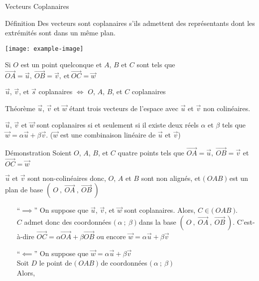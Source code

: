 \documentclass{cours}
\begin{document}
    \begin{Gpartie}{Vecteurs Coplanaires} 
        \begin{Spartie}{Définition} 
            Des vecteurs sont coplanaires s'ils admettent des représentants dont les extrémités sont dans un même plan.
            \begin{center}
                    \texttt{[image: example-image]}
                    \parbox{\linewidth}{}
            \end{center}
            Si $O$ est un point quelconque et $A$, $B$ et $C$ sont tels que $\overrightarrow{OA}=\vec{u},\ \overrightarrow{OB}=\vec{v},\ \text{et}\ \overrightarrow{OC}=\vec{w}$

            $\vec{u}$, $\vec{v}$, et $\vec{s}$ coplanaires $\iff$ $O$, $A$, $B$, et $C$ coplanaires
        \end{Spartie}
        \begin{Spartie}{Théorème} 
            $\vec{u}$, $\vec{v}$ et $\vec{w}$ étant trois vecteurs de l'espace avec $\vec{u}$ et $\vec{v}$ non colinéaires.

            $\vec{u}$, $\vec{v}$ et $\vec{w}$ sont coplanaires si et seulement si il existe deux réels $\alpha$ et $\beta$ tels que $\vec{w}=\alpha\vec{u}+\beta\vec{v}$. \quad\big($\vec{w}$ est une combinaison linéaire de $\vec{u}$ et $\vec{v}$\big)
            \pagebreak
            \begin{SSpartie}{Démonstration} 
                Soient $O$, $A$, $B$, et $C$ quatre points tels que $\overrightarrow{OA}=\vec{u},~\overrightarrow{OB}=\vec{v}$ et $\overrightarrow{OC}=\vec{w}$

                $\vec{u}$ et $\vec{v}$ sont non-colinéaires donc, $O$, $A$ et $B$ sont non alignés, et $\big(~OAB~\big)$ est un plan de base $\left(~O~,~\overrightarrow{OA}~,~\overrightarrow{OB}~\right)$
                \begin{itemize}[leftmargin=7ex]
                    \item[``$\implies$''] On suppose que $\vec{u}$, $\vec{v}$, et $\vec{w}$ sont coplanaires. Alors, $C\in\big(~OAB~\big)$. \\ $C$ admet donc des coordonnées $\big(~\alpha~;~\beta~\big)$ dans la base $\left(~O~,~\overrightarrow{OA}~,~\overrightarrow{OB}~\right)$. C'est-à-dire $\overrightarrow{OC}=\alpha\overrightarrow{OA}+\beta\overrightarrow{OB}$ ou encore $\vec{w}=\alpha\vec{u}+\beta\vec{v}$
                    \item[``$\impliedby$''] On suppose que $\vec{w}=\alpha\vec{u}+\beta\vec{v}$ \\ Soit $D$ le point de $\big(~OAB~\big)$ de coordonnées $\big(~\alpha~;~\beta~\big)$ \\ Alors, 
                     

\end{itemize}
\end{SSpartie}
\end{Spartie}
\end{Gpartie}
\end{document}
